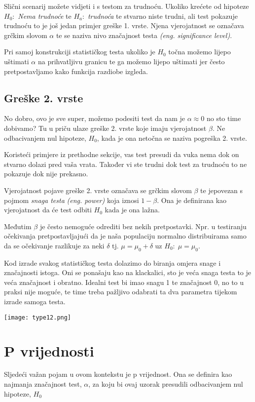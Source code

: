 Slični scenarij možete vidjeti i s testom za trudnoću. Ukoliko krećete od hipoteze  $H_0:$ \emph{Nema trudnoće} te $H_a:$ \emph{trudnoća} te stvarno niste trudni, ali test pokazuje trudnoću to je još jedan primjer greške 1. vrste. Njena vjerojatnost se označava grčkim slovom $\alpha$ te se naziva nivo značajnost testa \textit{(eng. significance level)}.

Pri samoj konstrukciji statističkog testa ukoliko je $H_0$ točna možemo lijepo uštimati $\alpha$ na prihvatljivu granicu te ga možemo lijepo uštimati jer često pretpostavljamo kako funkcija razdiobe izgleda.

\subsection{Greške 2. vrste}

No dobro, ovo je sve super, možemo podesiti test da nam je $\alpha \approx 0$ no sto time dobivamo? Tu u priču ulaze greške 2. vrste koje imaju vjerojatnost $\beta$. Ne odbacivanjem nul hipoteze, $H_0$, kada je ona netočna se naziva pogreška 2. vrste. \cite{engstat}

Koristeći primjere iz prethodne sekcije, vas test presudi da vuka nema dok on stvarno dolazi pred vaša vrata. Također vi ste trudni dok test za trudnoću to ne pokazuje dok nije prekasno. 

Vjerojatnost pojave greške 2. vrste označava se grčkim slovom $\beta$ te jepovezan s pojmom \emph{snaga testa} \textit{(eng. power)} koja iznosi $1-\beta$. Ona je definirana kao vjerojatnost da će test odbiti $H_0$ kada je ona lažna. 

Međutim $\beta$ je često nemoguće odrediti bez nekih pretpostavki. Npr. u testiranju očekivanja pretpostavljajući da je naša populaciju normalno distribuirama samo da se očekivanje razlikuje za neki $\delta$ tj. $\mu = \mu_0 + \delta$ uz $H_0: \; \mu = \mu_0$.

Kod izrade svakog statističkog testa dolazimo do biranja omjera snage i značajnosti istoga. Oni se ponašaju kao na klackalici, sto je veća snaga testa to je veća značajnost i obratno. Idealni test bi imao snagu 1 te značajnost 0, no to u praksi nije moguće, te time treba pažljivo odabrati ta dva parametra tijekom izrade samoga testa.

\texttt{[image: type12.png]}

\section{P vrijednosti}
Sljedeći važan pojam u ovom kontekstu je p vrijednost. Ona se definira kao najmanja značajnost test, $\alpha$, za koju bi ovaj uzorak presudili odbacivanjem nul hipoteze, $H_0$ \cite{engstat}


